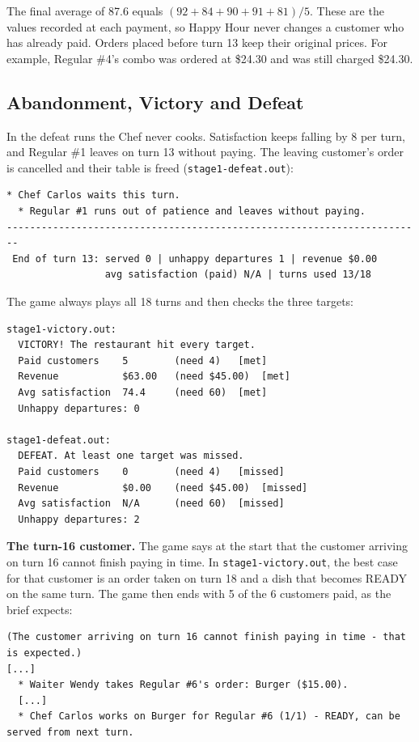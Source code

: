 The final average of 87.6 equals $(92+84+90+91+81)/5$. These are the values recorded at
each payment, so Happy Hour never changes a customer who has already paid. Orders placed
before turn 13 keep their original prices. For example, Regular \#4's combo was ordered
at \$24.30 and was still charged \$24.30.

\subsection{Abandonment, Victory and Defeat}

In the defeat runs the Chef never cooks. Satisfaction keeps falling by 8 per turn, and
Regular \#1 leaves on turn 13 without paying. The leaving customer's order is cancelled
and their table is freed (\texttt{stage1-defeat.out}):

\begin{lstlisting}[style=run]
  * Chef Carlos waits this turn.
  * Regular #1 runs out of patience and leaves without paying.
------------------------------------------------------------------------
 End of turn 13: served 0 | unhappy departures 1 | revenue $0.00
                 avg satisfaction (paid) N/A | turns used 13/18
\end{lstlisting}

The game always plays all 18 turns and then checks the three targets:

\begin{lstlisting}[style=run]
stage1-victory.out:
  VICTORY! The restaurant hit every target.
  Paid customers    5        (need 4)   [met]
  Revenue           $63.00   (need $45.00)  [met]
  Avg satisfaction  74.4     (need 60)  [met]
  Unhappy departures: 0

stage1-defeat.out:
  DEFEAT. At least one target was missed.
  Paid customers    0        (need 4)   [missed]
  Revenue           $0.00    (need $45.00)  [missed]
  Avg satisfaction  N/A      (need 60)  [missed]
  Unhappy departures: 2
\end{lstlisting}

\textbf{The turn-16 customer.} The game says at the start that the customer arriving on
turn 16 cannot finish paying in time. In \texttt{stage1-victory.out}, the best case for
that customer is an order taken on turn 18 and a dish that becomes READY on the same turn.
The game then ends with 5 of the 6 customers paid, as the brief expects:

\begin{lstlisting}[style=run]
(The customer arriving on turn 16 cannot finish paying in time - that is expected.)
[...]
  * Waiter Wendy takes Regular #6's order: Burger ($15.00).
  [...]
  * Chef Carlos works on Burger for Regular #6 (1/1) - READY, can be served from next turn.
\end{lstlisting}
